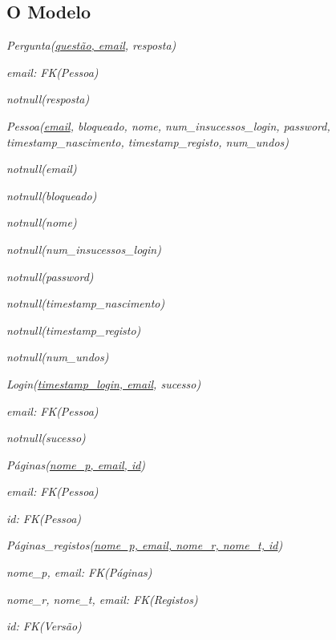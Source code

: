 \documentclass[11pt,a4paper]{article}
\begin{document}
\subsection{O Modelo}

\begin{description}[noitemsep]
	\item\textit{ Pergunta(\underline{quest\~ao, email}, resposta)}
	\item\textit{ email: FK(Pessoa)}
	\item\textit{ notnull(resposta)}
\end{description}

\begin{description}[noitemsep]
	\item\textit{ Pessoa(\underline{email}, bloqueado, nome, num\_insucessos\_login, password, timestamp\_nascimento, timestamp\_registo, num\_undos)}
	\item\textit{ notnull(email)}
	\item\textit{ notnull(bloqueado)}
	\item\textit{ notnull(nome)}
	\item\textit{ notnull(num\_insucessos\_login)}
	\item\textit{ notnull(password)}
	\item\textit{ notnull(timestamp\_nascimento)}
	\item\textit{ notnull(timestamp\_registo)}
	\item\textit{ notnull(num\_undos)}
\end{description}

\begin{description}[noitemsep]
	\item\textit{ Login(\underline{timestamp\_login, email}, sucesso)}
	\item\textit{ email: FK(Pessoa)}
	\item\textit{ notnull(sucesso)}
\end{description}

\begin{description}[noitemsep]
	\item\textit{ P\'{a}ginas(\underline{nome\_p, email, id})}
	\item\textit{ email: FK(Pessoa)}
	\item\textit{ id: FK(Pessoa)}
\end{description}

\begin{description}[noitemsep]
	\item\textit{ P\'{a}ginas\_registos(\underline{nome\_p, email, nome\_r, nome\_t, id})}
	\item\textit{ nome\_p, email: FK(P\'{a}ginas)}
	\item\textit{ nome\_r, nome\_t, email: FK(Registos)}
	\item\textit{ id: FK(Vers\~{a}o)}
\end{description}
\end{document}
